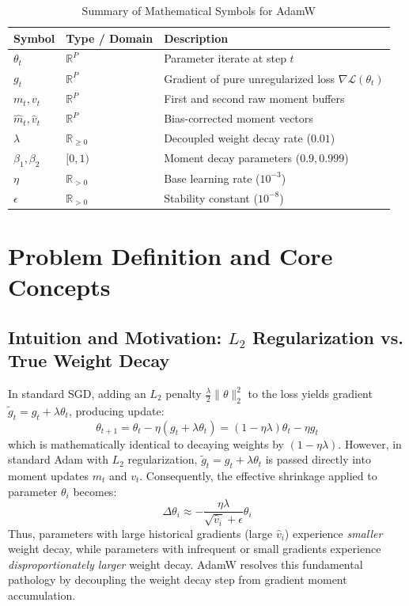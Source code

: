 \documentclass[11pt,a4paper]{article}
\theoremstyle{definition}
\begin{document}
\begin{table}[h]
\centering
\caption{Summary of Mathematical Symbols for AdamW}
\begin{tabular}{lll}
\toprule
\textbf{Symbol} & \textbf{Type / Domain} & \textbf{Description} \\
\midrule
$\theta_t$ & $\mathbb{R}^P$ & Parameter iterate at step $t$ \\
$g_t$ & $\mathbb{R}^P$ & Gradient of pure unregularized loss $\nabla \mathcal{L}(\theta_t)$ \\
$m_t, v_t$ & $\mathbb{R}^P$ & First and second raw moment buffers \\
$\hat{m}_t, \hat{v}_t$ & $\mathbb{R}^P$ & Bias-corrected moment vectors \\
$\lambda$ & $\mathbb{R}_{\ge 0}$ & Decoupled weight decay rate ($0.01$) \\
$\beta_1, \beta_2$ & $[0, 1)$ & Moment decay parameters ($0.9, 0.999$) \\
$\eta$ & $\mathbb{R}_{> 0}$ & Base learning rate ($10^{-3}$) \\
$\epsilon$ & $\mathbb{R}_{> 0}$ & Stability constant ($10^{-8}$) \\
\bottomrule
\end{tabular}
\end{table}

\section{Problem Definition and Core Concepts}

\subsection{Intuition and Motivation: $L_2$ Regularization vs. True Weight Decay}
In standard SGD, adding an $L_2$ penalty $\frac{\lambda}{2} \|\theta\|_2^2$ to the loss yields gradient $\tilde{g}_t = g_t + \lambda \theta_t$, producing update:
\begin{equation}
\theta_{t+1} = \theta_t - \eta (g_t + \lambda \theta_t) = (1 - \eta \lambda) \theta_t - \eta g_t
\end{equation}
which is mathematically identical to decaying weights by $(1 - \eta \lambda)$.
However, in standard Adam with $L_2$ regularization, $\tilde{g}_t = g_t + \lambda \theta_t$ is passed directly into moment updates $m_t$ and $v_t$. Consequently, the effective shrinkage applied to parameter $\theta_i$ becomes:
\begin{equation}
\Delta \theta_i \approx -\frac{\eta \lambda}{\sqrt{\hat{v}_i} + \epsilon} \theta_i
\end{equation}
Thus, parameters with large historical gradients (large $\hat{v}_i$) experience \textit{smaller} weight decay, while parameters with infrequent or small gradients experience \textit{disproportionately larger} weight decay. AdamW resolves this fundamental pathology by decoupling the weight decay step from gradient moment accumulation.
\end{document}
